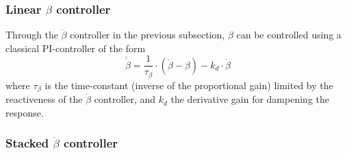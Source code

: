 \documentclass{article}
\begin{document}
\subsubsection{Linear $\beta$ controller}

Through the $\dot{\beta}$ controller in the previous subsection, $\beta$ can be controlled using a classical PI-controller of the form
\begin{equation}
\breve{\dot{\beta}} = \frac{1}{\tau_{\beta}} \cdot \left( \breve{\beta} - \beta \right) - k_d \cdot \dot{\beta}
\label{eq:betactrl}
\end{equation}
where $\tau_{\beta}$ is the time-constant (inverse of the proportional gain) limited by the reactiveness of the $\dot{\beta}$ controller, and $k_d$ the derivative gain for dampening the response.

\subsubsection{Stacked $\dot{\beta}$ controller}
\end{document}
